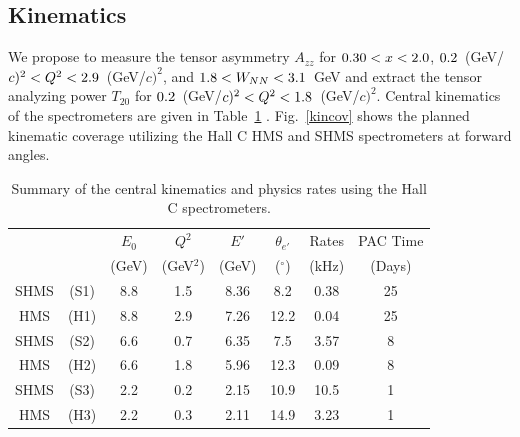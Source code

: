 \subsection{Kinematics}
\label{kinematics}

\label{EXP}
We propose to measure the tensor asymmetry $A_{zz}$ for $0.30<x<2.0$, $0.2$~(GeV/$c)^2 < Q^2 <2.9$~(GeV/$c)^2$, and $1.8 < W_{NN} < 3.1$~GeV and extract the tensor analyzing power $T_{20}$ for $\QMINT20$~(GeV/$c)^2 < Q^2 <\QMAXT20$~(GeV/$c)^2$. Central kinematics of the spectrometers are given in Table~\ref{RATES1}
. Fig.~\ref{kincov} shows the planned kinematic coverage utilizing the Hall C HMS and SHMS spectrometers at forward angles. 

\begin{table}
\begin{center}
\begin{tabular}{cc|c|c|c|c|c|c}
 & & $E_0$ & $Q^2$    	& $E'$  &    $\theta_{e'}$  &  Rates   & PAC Time   \\
& & (GeV) & (GeV$^2$)  & (GeV)  &     ($^{\circ}$)   &   (kHz)  & (Days) \\
\hline\hline
SHMS & (S1) & 8.8	&  1.5	&  8.36	&    8.2  	&    0.38	&   25 \\
HMS  & (H1) & 8.8	&  2.9	&  7.26	&    12.2	&    0.04	&   25 \\  
SHMS & (S2) & 6.6	&  0.7	&  6.35	&    7.5 	&    3.57	&   8 \\
HMS  & (H2) & 6.6	&  1.8	&  5.96	&    12.3	&    0.09	&   8 \\  
SHMS & (S3) & 2.2	&  0.2	&  2.15	&    10.9 	&    10.5	&   1 \\
HMS  & (H3) & 2.2	&  0.3	&  2.11	&    14.9	&    3.23	&   1 \\  
\hline\hline
\end{tabular}
\caption{\label{RATES1}Summary of the central kinematics and physics rates using the Hall C  spectrometers.}
\end{center}
\end{table}









